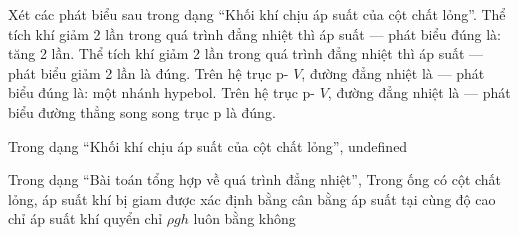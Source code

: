 \begin{ex}
Xét các phát biểu sau trong dạng “Khối khí chịu áp suất của cột chất lỏng”.
\choiceTF
{\True Thể tích khí giảm 2 lần trong quá trình đẳng nhiệt thì áp suất — phát biểu đúng là: tăng 2 lần.}
{Thể tích khí giảm 2 lần trong quá trình đẳng nhiệt thì áp suất — phát biểu giảm 2 lần là đúng.}
{\True Trên hệ trục p- $V$, đường đẳng nhiệt là — phát biểu đúng là: một nhánh hypebol.}
{Trên hệ trục p- $V$, đường đẳng nhiệt là — phát biểu đường thẳng song song trục p là đúng.}
\end{ex}

\begin{bt}
Trong dạng “Khối khí chịu áp suất của cột chất lỏng”, undefined
\end{bt}

\begin{ex}
Trong dạng “Bài toán tổng hợp về quá trình đẳng nhiệt”, Trong ống có cột chất lỏng, áp suất khí bị giam được xác định bằng
\choice
{\True cân bằng áp suất tại cùng độ cao}
{chỉ áp suất khí quyển}
{chỉ $\rho gh$}
{luôn bằng không}
\end{ex}

